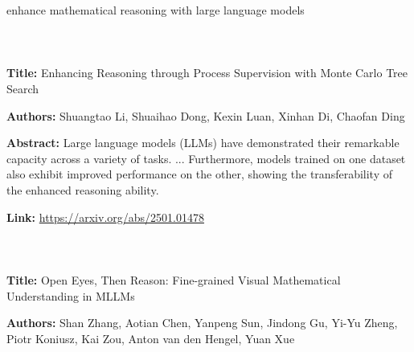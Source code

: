 \begin{textcolorbox}
enhance mathematical reasoning with large language models
\\\\
\\\\
\textbf{Title:} Enhancing Reasoning through Process Supervision with Monte Carlo Tree Search

\textbf{Authors:} Shuangtao Li, Shuaihao Dong, Kexin Luan, Xinhan Di, Chaofan Ding

\textbf{Abstract:} Large language models (LLMs) have demonstrated their remarkable capacity across a variety of tasks. 
...
Furthermore, models trained on one dataset also exhibit improved performance on the other, showing the transferability of the enhanced reasoning ability.

\textbf{Link:} \url{https://arxiv.org/abs/2501.01478}
\\\\
\\\\
\textbf{Title:} Open Eyes, Then Reason: Fine-grained Visual Mathematical Understanding in MLLMs

\textbf{Authors:} Shan Zhang, Aotian Chen, Yanpeng Sun, Jindong Gu, Yi-Yu Zheng, Piotr Koniusz, Kai Zou, Anton van den Hengel, Yuan Xue


\end{textcolorbox}
